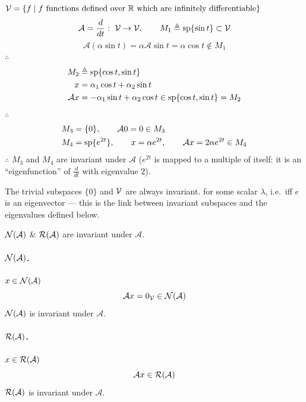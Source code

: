\begin{example}
$\mathcal{V}=\{f\mid f\text{ functions defined over }\mathbb{R}\text{ which are infinitely differentiable}\}$
\[
\mathcal{A}=\frac{d}{dt}:\ \mathcal{V}\to\mathcal{V}, \qquad M_1\triangleq\operatorname{sp}\{\sin t\}\subset\mathcal{V}
\]
\[
\mathcal{A}(\alpha\sin t)=\alpha\mathcal{A}\sin t=\alpha\cos t\notin M_1
\]
$\therefore$ 
\begin{align*}
M_2&\triangleq\operatorname{sp}\{\cos t,\sin t\}\\
x&=\alpha_1\cos t+\alpha_2\sin t\\
\mathcal{A}x&=-\alpha_1\sin t+\alpha_2\cos t\in\operatorname{sp}\{\cos t,\sin t\}= M_2
\end{align*}
$\therefore$ 
\begin{align*}
M_3&=\{0\}, \qquad \mathcal{A}0=0\in M_3\\
M_4&=\operatorname{sp}\{e^{2t}\},\qquad x=\alpha e^{2t},\qquad \mathcal{A}x=2\alpha e^{2t}\in M_4
\end{align*}
$\therefore$ $M_3$ and $M_4$ are invariant under $\mathcal{A}$ ($e^{2t}$ is mapped to a multiple of itself: it is an ``eigenfunction'' of $\frac{d}{dt}$ with eigenvalue $2$).
\end{example}
\begin{insight}
The trivial subspaces $\{0\}$ and $\mathcal{V}$ are always invariant.  for some scalar $\lambda$, i.e.\ iff $e$ is an eigenvector --- this is the link between invariant subspaces and the eigenvalues defined below.
\end{insight}

\begin{example}
$\mathcal{N}(\mathcal{A})$ \& $\mathcal{R}(\mathcal{A})$ are invariant under $\mathcal{A}$.

\begin{minipage}[t]{0.48\textwidth}
\paragraph{$\mathcal{N}(\mathcal{A})$.} $x\in\mathcal{N}(\mathcal{A})$
\[
\mathcal{A}x=0_{\mathcal{V}}\in\mathcal{N}(\mathcal{A})
\]
$\mathcal{N}(\mathcal{A})$ is invariant under $\mathcal{A}$.
\end{minipage}\hfill
\begin{minipage}[t]{0.48\textwidth}
\paragraph{$\mathcal{R}(\mathcal{A})$.} $x\in\mathcal{R}(\mathcal{A})$
\[
\mathcal{A}x\in\mathcal{R}(\mathcal{A})
\]
$\mathcal{R}(\mathcal{A})$ is invariant under $\mathcal{A}$.
\end{minipage}
\end{example}


